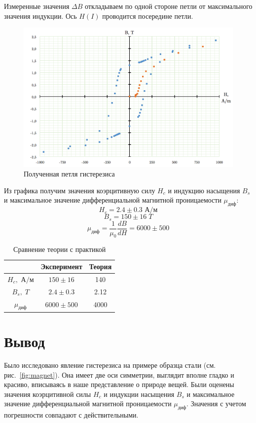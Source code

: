 \documentclass{letnab}
\begin{document}
Измеренные значения $\Delta B$ откладываем по одной стороне петли от максимального значения индукции. Ось $H(I)$ проводится посередине петли. 

\begin{figure}[H]
\centering
\includegraphics[width = .95\lw]{plot}
\caption{Полученная петля гистерезиса}
\end{figure}

Из графика получим значения коэрцитивную силу $H_c$ и индукцию насыщения $B_s$ и максимальное значение дифференциальной магнитной проницаемости $\mu_\text{диф}$:
$$H_c = 2.4 \pm 0.3 \text{ А/м}$$
$$B_s = 150 \pm 16 \; T$$
$$\mu_\text{диф} = \dfrac{1}{\mu_0} \dfrac{dB}{dH} = 6000 \pm 500$$
\begin{table}[H]
\centering
\begin{tabular}{|c|c|c|}
\hline 
 & Эксперимент & Теория \\ 
\hline 
$H_c, \text{ А/м}$ & $150 \pm 16$ & 140 \\ 
\hline 
$B_s, \; T$ & $2.4 \pm 0.3$ & 2.12 \\ 
\hline 
$\mu_\text{диф}$ & $6000 \pm 500$ & 4000 \\ 
\hline 
\end{tabular} 
\caption{Сравнение теории с практикой}
\end{table}
\section{Вывод}  

Было исследовано явление гистерезиса на примере образца стали (см. рис.~\ref{fig:magnet}). Она имеет две оси симметрии, выглядит вполне гладко и красиво, вписываясь в наше представление о природе вещей. Были оценены значения коэрцитивной силы $H_c$ и индукции насыщения $B_s$ и максимальное значение дифференциальной магнитной проницаемости $\mu_\text{диф}$. Значения с учетом погрешности совпадают с действительными.
\end{document}
